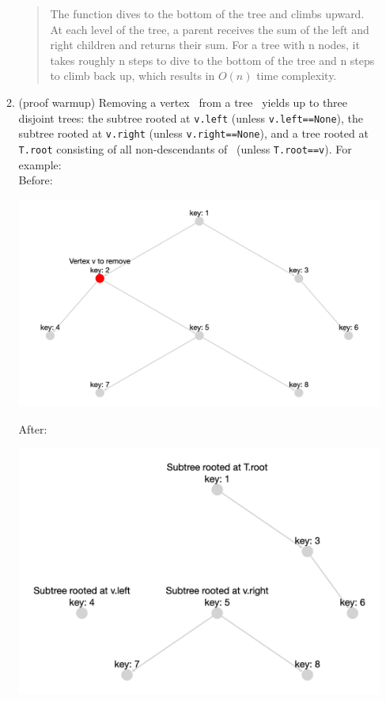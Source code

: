 \documentclass[11pt]{article}
\begin{document}
\begin{enumerate}
\begin{enumerate}
\begin{quote}
    \color{purple}
    The function dives to the bottom of the tree and climbs upward. At each level of the tree, a parent receives the sum of the left and right children and returns their sum. For a tree with n nodes, it takes roughly n steps to dive to the bottom of the tree and n steps to climb back up, which results in $O(n)$ time complexity. 
\end{quote}
 
 \item (proof warmup) \label{part:warmup}
 Removing a vertex \btv\ from a tree \treeT\ yields up to three disjoint trees: the subtree rooted at
 \texttt{v.left} (unless \texttt{v.left==None}), the subtree rooted at
 \texttt{v.right} (unless \texttt{v.right==None}), and a tree rooted at \texttt{T.root} consisting of all non-descendants of \btv\ (unless \texttt{T.root==v}).  For example:
 \\

 Before:
 
 \includegraphics[scale=.175]{Fall23/p0_q1b_before.png}
 
 
 After:
 
  \includegraphics[scale=.225]{Fall23/p0_q1b_after.png}


\end{enumerate}
\end{enumerate}
\end{document}
